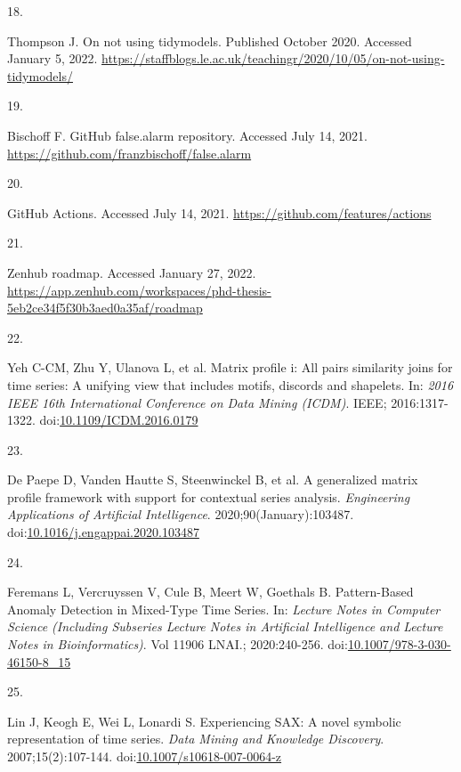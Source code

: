 \documentclass[12pt,twoside]{fmupthesis}
\newlength{\csllabelwidth}
\newlength{\cslhangindent}
\newenvironment{CSLReferences}[2] %
 {%
  \setlength{\parindent}{0pt}
  \ifodd #1 \everypar{\setlength{\hangindent}{\cslhangindent}}\ignorespaces\fi
  \ifnum #2 > 0
  \setlength{\parskip}{#2\baselineskip}
  \fi
 }%
 {}
\newcommand{\CSLLeftMargin}[1]{\parbox[t]{\csllabelwidth}{#1}}
\newcommand{\CSLRightInline}[1]{\parbox[t]{\linewidth - \csllabelwidth}{#1}}
\begin{document}
\begin{CSLReferences}{0}{0}
\leavevmode{}%
\CSLLeftMargin{18. }
\CSLRightInline{Thompson J. On not using tidymodels. Published October 2020. Accessed January 5, 2022. \url{https://staffblogs.le.ac.uk/teachingr/2020/10/05/on-not-using-tidymodels/}}

\leavevmode{}%
\CSLLeftMargin{19. }
\CSLRightInline{Bischoff F. {GitHub false.alarm repository}. Accessed July 14, 2021. \url{https://github.com/franzbischoff/false.alarm}}

\leavevmode{}%
\CSLLeftMargin{20. }
\CSLRightInline{{GitHub Actions}. Accessed July 14, 2021. \url{https://github.com/features/actions}}

\leavevmode{}%
\CSLLeftMargin{21. }
\CSLRightInline{{Zenhub roadmap}. Accessed January 27, 2022. \url{https://app.zenhub.com/workspaces/phd-thesis-5eb2ce34f5f30b3aed0a35af/roadmap}}

\leavevmode{}%
\CSLLeftMargin{22. }
\CSLRightInline{Yeh C-CM, Zhu Y, Ulanova L, et al. Matrix profile i: All pairs similarity joins for time series: A unifying view that includes motifs, discords and shapelets. In: \emph{2016 IEEE 16th International Conference on Data Mining (ICDM)}. IEEE; 2016:1317-1322. doi:\href{https://doi.org/10.1109/ICDM.2016.0179}{10.1109/ICDM.2016.0179}}

\leavevmode{}%
\CSLLeftMargin{23. }
\CSLRightInline{De Paepe D, Vanden Hautte S, Steenwinckel B, et al. {A generalized matrix profile framework with support for contextual series analysis}. \emph{Engineering Applications of Artificial Intelligence}. 2020;90(January):103487. doi:\href{https://doi.org/10.1016/j.engappai.2020.103487}{10.1016/j.engappai.2020.103487}}

\leavevmode{}%
\CSLLeftMargin{24. }
\CSLRightInline{Feremans L, Vercruyssen V, Cule B, Meert W, Goethals B. {Pattern-Based Anomaly Detection in Mixed-Type Time Series}. In: \emph{Lecture Notes in Computer Science (Including Subseries Lecture Notes in Artificial Intelligence and Lecture Notes in Bioinformatics)}. Vol 11906 LNAI.; 2020:240-256. doi:\href{https://doi.org/10.1007/978-3-030-46150-8_15}{10.1007/978-3-030-46150-8\_15}}

\leavevmode{}%
\CSLLeftMargin{25. }
\CSLRightInline{Lin J, Keogh E, Wei L, Lonardi S. {Experiencing SAX: A novel symbolic representation of time series}. \emph{Data Mining and Knowledge Discovery}. 2007;15(2):107-144. doi:\href{https://doi.org/10.1007/s10618-007-0064-z}{10.1007/s10618-007-0064-z}}


\end{CSLReferences}
\end{document}
